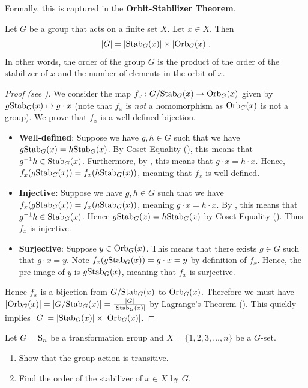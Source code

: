 Formally, this is captured in the \textbf{Orbit-Stabilizer Theorem}.
\begin{theorem}\label{thrm-orbit-stabilizer}
    Let $G$ be a group that acts on a finite set $X$. Let $x \in X$. Then
    \[
        |G| = |\mathrm{Stab}_{G}(x)| \times |\mathrm{Orb}_{G}(x)|.
    \]
    In other words, the order of the group $G$ is the product of the order of the stabilizer of $x$ and the number of elements in the orbit of $x$.
\end{theorem}

\begin{proof}[Proof (see \cite{humphreys_1996})]
    We consider the map $f_x: G/\mathrm{Stab}_{G}(x) \to \mathrm{Orb}_{G}(x)$ given by $g\mathrm{Stab}_{G}(x) \mapsto g \cdot x$ (note that $f_x$ is \textit{not} a homomorphism as $\mathrm{Orb}_{G}(x)$ is not a group). We prove that $f_x$ is a well-defined bijection.
    \begin{itemize}
        \item \textbf{Well-defined}: Suppose we have $g, h \in G$ such that we have $g\mathrm{Stab}_{G}(x) = h\mathrm{Stab}_{G}(x)$. By Coset Equality (), this means that $g^{-1}h \in \mathrm{Stab}_{G}(x)$. Furthermore, by , this means that $g\cdot x = h\cdot x$. Hence, $f_x(g\mathrm{Stab}_{G}(x)) = f_x(h\mathrm{Stab}_{G}(x))$, meaning that $f_x$ is well-defined.
        \item \textbf{Injective}: Suppose we have $g, h \in G$ such that we have $f_x(g\mathrm{Stab}_{G}(x)) = f_x(h\mathrm{Stab}_{G}(x))$, meaning $g\cdot x = h\cdot x$. By , this means that $g^{-1}h \in \mathrm{Stab}_{G}(x)$. Hence $g\mathrm{Stab}_{G}(x) = h\mathrm{Stab}_{G}(x)$ by Coset Equality (). Thus $f_x$ is injective.
        \item \textbf{Surjective}: Suppose $y \in \mathrm{Orb}_{G}(x)$. This means that there exists $g \in G$ such that $g\cdot x = y$. Note $f_x(g\mathrm{Stab}_{G}(x)) = g\cdot x = y$ by definition of $f_x$. Hence, the pre-image of $y$ is $g\mathrm{Stab}_{G}(x)$, meaning that $f_x$ is surjective.
    \end{itemize}
    Hence $f_x$ is a bijection from $G/\mathrm{Stab}_{G}(x)$ to $\mathrm{Orb}_{G}(x)$. Therefore we must have $|\mathrm{Orb}_{G}(x)| = |G/\mathrm{Stab}_{G}(x)| = \frac{|G|}{|\mathrm{Stab}_{G}(x)|}$ by Lagrange's Theorem (). This quickly implies $|G| = |\mathrm{Stab}_{G}(x)|\times|\mathrm{Orb}_{G}(x)|$.
\end{proof}

\begin{exercise}
    Let $G = \mathrm{S}_{n}$ be a transformation group and $X = \{1, 2, 3, \dots, n\}$ be a $G$-set.
    \begin{enumerate}[label=(\roman*)]
        \item Show that the group action is transitive.
        \item Find the order of the stabilizer of $x \in X$ by $G$.
    \end{enumerate}
\end{exercise}

